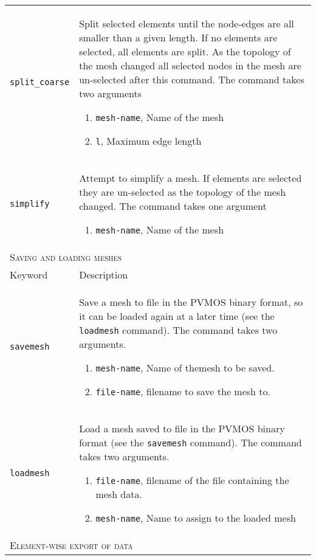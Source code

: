 \documentclass[noshowpacs,preprintnumbers,amsmath,amssymb, letter]{revtex4}
\begin{document}
\begin{longtable}{p{}p{}}
\texttt{split\_coarse}	& Split selected elements until the node-edges are all smaller than a given length. If no elements are selected, all elements are split. As the topology of the mesh changed all selected nodes in the mesh are un-selected after this command. The command takes two arguments 
\begin{enumerate}
\item \texttt{mesh-name}, Name of the mesh
\item \texttt{l}, Maximum edge length
\end{enumerate}\\
\texttt{simplify}	&  Attempt to simplify a mesh. If elements are selected they are un-selected as the topology of the mesh changed. The command takes one argument 
\begin{enumerate}
\item \texttt{mesh-name}, Name of the mesh
\end{enumerate}\\
\multicolumn{2}{l}{\textsc{Saving and loading meshes}} \\*
\hline
Keyword & Description \\
\texttt{savemesh}	& Save a mesh to file in the PVMOS binary format, so it can be loaded again at a later time (see the \texttt{loadmesh} command). The command takes two arguments.
\begin{enumerate}
\item \texttt{mesh-name}, Name of themesh to be saved.
\item \texttt{file-name}, filename to save the mesh to.
\end{enumerate}\\
\texttt{loadmesh}	& Load a mesh saved to file in the PVMOS binary format (see the \texttt{savemesh} command). The command takes two arguments.
\begin{enumerate}
\item \texttt{file-name}, filename of the file containing the mesh data.
\item \texttt{mesh-name}, Name to assign to the loaded mesh
\end{enumerate}\\
\multicolumn{2}{l}{\textsc{Element-wise export of data}} \\*

\end{longtable}
\end{document}
